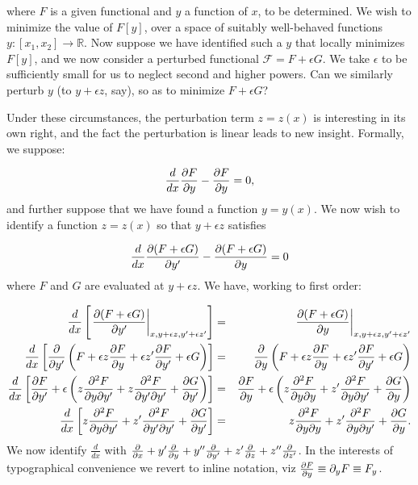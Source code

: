 \documentclass[pdflatex,sn-mathphys-num]{sn-jnl}%
\theoremstyle{thmstyleone}%
\theoremstyle{thmstyletwo}%
\theoremstyle{thmstylethree}%
\begin{document}
\noindent where $F$ is a given functional and $y$ a function of $x$,
to be determined.  We wish to minimize the value of $F[y]$, over a
space of suitably well-behaved functions
$y\colon\left[x_1,x_2\right]\longrightarrow\mathbb{R}$.  Now suppose
we have identified such a $y$ that locally minimizes $F[y]$, and we
now consider a perturbed functional $\mathcal{F}=F+\epsilon G$.  We
take $\epsilon$ to be sufficiently small for us to neglect second and
higher powers.  Can we similarly perturb $y$ (to $y+\epsilon z$, say),
so as to minimize $F+\epsilon G$?

Under these circumstances, the perturbation term $z=z(x)$ is
interesting in its own right, and the fact the perturbation is linear
leads to new insight.  Formally, we suppose:

\begin{equation}
  \frac{d}{dx}\frac{\partial{F}}{\partial{y}}-\frac{\partial{F}}{\partial{y}} = 0,
\end{equation}
%
and further suppose that we have found a function $y=y(x)$.  We now
wish to identify a function $z=z(x)$ so that $y+\epsilon z$ satisfies

\begin{equation}
  \frac{d}{dx}\frac{\partial{(F+\epsilon G)}}{\partial{y'}}-\frac{\partial{(F+\epsilon G)}}{\partial{y}} = 0
\end{equation}
%
where $F$ and $G$ are evaluated at $y+\epsilon z$.  We have, working
to first order:

\begin{eqnarray}
\frac{d}{dx}\left[\left.\frac{\partial{(F+\epsilon G)}}{\partial{y'}}\right|_{x,y+\epsilon z,y'+\epsilon z'}\right]
&=& \left.\frac{\partial{(F+\epsilon G)}}{\partial{y}}\right|_{x,y+\epsilon z,y'+\epsilon z'}\nonumber\\
\frac{d}{dx}\left[\frac{\partial{}}{\partial{y'}}\left(F + \epsilon z\frac{\partial{F}}{\partial{y}} + \epsilon z'\frac{\partial{F}}{\partial{y'}}+\epsilon G\right)\right]
&=& \frac{\partial{}}{\partial{y}}\left(F + \epsilon z\frac{\partial{F}}{\partial{y}} + \epsilon z'\frac{\partial{F}}{\partial{y'}}+\epsilon G\right)\nonumber\\
\frac{d}{dx}\left[\frac{\partial{F}}{\partial{y'}} + \epsilon\left(z\frac{\partial^2{F}}{\partial{y}\partial{y'}} + z\frac{\partial^2{F}}{\partial{y'}\partial{y'}} + \frac{\partial{G}}{\partial{y'}}\right)\right]
&=& \frac{\partial{F}}{\partial{y}} + \epsilon\left(z\frac{\partial^2{F}}{\partial{y}\partial{y}} + z'\frac{\partial^2{F}}{\partial{y}\partial{y'}} + \frac{\partial{G}}{\partial{y}}\right)\nonumber\\
\frac{d}{dx}\left[z\frac{\partial^2{F}}{\partial{y}\partial{y'}} + z'\frac{\partial^2{F}}{\partial{y'}\partial{y'}} + \frac{\partial{G}}{\partial{y'}}\right]
&=& z\frac{\partial^2{F}}{\partial{y}\partial{y}} + z'\frac{\partial^2{F}}{\partial{y}\partial{y'}} + \frac{\partial{G}}{\partial{y}}.
\end{eqnarray}
%
We now identify $\frac{d}{dx}$ with $\frac{\partial{}}{\partial{x}} + y'\frac{\partial{}}{\partial{y}} +
y''\frac{\partial{}}{\partial{y'}} + z'\frac{\partial{}}{\partial{z}} + z''\frac{\partial{}}{\partial{z'}}$.  In the interests of
typographical convenience we revert to inline notation, viz
$\frac{\partial{F}}{\partial{y}}\equiv\partial_yF\equiv F_y$.
\end{document}
